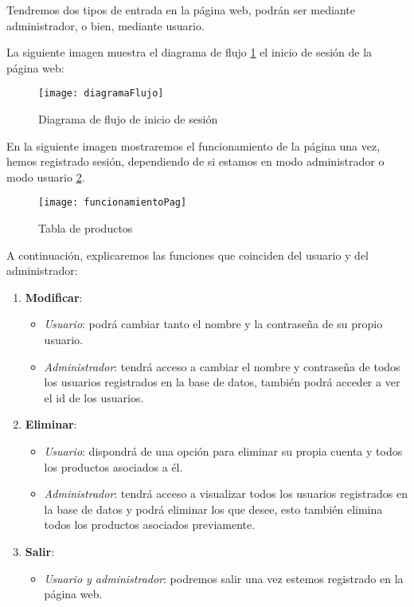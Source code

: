 Tendremos dos tipos de entrada en la página web, podrán ser mediante administrador, o bien, mediante usuario.

La siguiente imagen muestra el diagrama de flujo \ref{fig:diagrama} el inicio de sesión de la página web:

\begin{figure}[H]
    \centering
    \texttt{[image: diagramaFlujo]}
    \caption{Diagrama de flujo de inicio de sesión}
    \label{fig:diagrama}
\end{figure}

En la siguiente imagen mostraremos el funcionamiento de la página una vez, hemos registrado sesión, dependiendo de si estamos en modo administrador o modo usuario \ref{fig:funcionamiento}.

\begin{figure}[H]
    \centering
    \texttt{[image: funcionamientoPag]}
    \caption{Tabla de productos}
    \label{fig:funcionamiento}
\end{figure}

A continuación, explicaremos las funciones que coinciden del usuario y del administrador:

\begin{enumerate}
	\item \textbf{Modificar}:
	\begin{itemize}
		\item \textit{Usuario}: podrá cambiar tanto el nombre y la contraseña de su propio usuario.
		\item \textit{Administrador}: tendrá acceso a cambiar el nombre y contraseña de todos los usuarios registrados en la base de datos, también podrá acceder a ver el id de los usuarios.
\end{itemize}			
\item \textbf{Eliminar}:
	\begin{itemize}
		\item \textit{Usuario}: dispondrá de una opción para eliminar su propia cuenta y todos los productos asociados a él.
		\item \textit{Administrador}: tendrá acceso a visualizar todos los usuarios registrados en la base de datos y podrá eliminar los que desee, esto también elimina todos los productos asociados previamente.
	\end{itemize}			
\item \textbf{Salir}:
	\begin{itemize}
		\item \textit{Usuario y administrador}: podremos salir una vez estemos registrado en la página web.
	\end{itemize}			
\end{enumerate}

